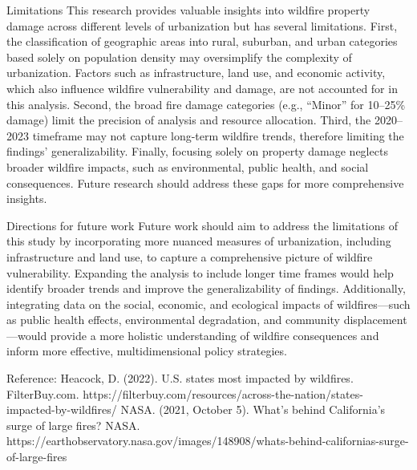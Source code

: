 \documentclass[
  letterpaper,
  DIV=11,
  numbers=noendperiod]{scrartcl}
\begin{document}
Limitations This research provides valuable insights into wildfire
property damage across different levels of urbanization but has several
limitations. First, the classification of geographic areas into rural,
suburban, and urban categories based solely on population density may
oversimplify the complexity of urbanization. Factors such as
infrastructure, land use, and economic activity, which also influence
wildfire vulnerability and damage, are not accounted for in this
analysis. Second, the broad fire damage categories (e.g., ``Minor'' for
10--25\% damage) limit the precision of analysis and resource
allocation. Third, the 2020--2023 timeframe may not capture long-term
wildfire trends, therefore limiting the findings' generalizability.
Finally, focusing solely on property damage neglects broader wildfire
impacts, such as environmental, public health, and social consequences.
Future research should address these gaps for more comprehensive
insights.

Directions for future work Future work should aim to address the
limitations of this study by incorporating more nuanced measures of
urbanization, including infrastructure and land use, to capture a
comprehensive picture of wildfire vulnerability. Expanding the analysis
to include longer time frames would help identify broader trends and
improve the generalizability of findings. Additionally, integrating data
on the social, economic, and ecological impacts of wildfires---such as
public health effects, environmental degradation, and community
displacement---would provide a more holistic understanding of wildfire
consequences and inform more effective, multidimensional policy
strategies.

Reference: Heacock, D. (2022). U.S. states most impacted by wildfires.
FilterBuy.com.
https://filterbuy.com/resources/across-the-nation/states-impacted-by-wildfires/
NASA. (2021, October 5). What's behind California's surge of large
fires? NASA.
https://earthobservatory.nasa.gov/images/148908/whats-behind-californias-surge-of-large-fires
\end{document}
